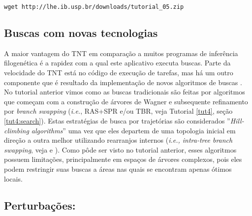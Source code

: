 \begin{center}
\small \texttt{wget http://lhe.ib.usp.br/downloads/tutorial\_05.zip}\\
\end{center}


\newpage
\pagestyle{fancy} %
\begin{refsection}
\renewcommand*{\finalnamedelim}{\addspace\&\space}%

\section{Buscas com novas tecnologias}\label{tut5:newtech}

A maior vantagem do TNT \parencite{GoloboffEtAl_2008} em comparação a muitos programas de inferência filogenética é a rapidez com a qual este aplicativo executa buscas. Parte da velocidade do TNT está no código de execução de tarefas, mas há um outro componente que é resultado da implementação de novos algoritmos de buscas \parencite{Goloboff_1999, Nixon_1999}. No tutorial anterior vimos como as buscas tradicionais são feitas por algoritmos que começam com a construção de árvores de Wagner e subsequente refinamento por \textit{branch swapping} (\textit{i.e.}, RAS+SPR e/ou TBR, veja Tutorial \ref{tut4}, seção \ref{tut4:search}). Estas estratégias de busca por trajetórias são considerados ''\textit{Hill-climbing algorithms}'' uma vez que eles departem de uma topologia inicial em direção a outra melhor utilizando rearranjos internos (\textit{i.e., intra-tree branch swapping}, veja \textcite{Giribet_2007} e \textcite{Goloboff_1999}). Como pôde ser visto no tutorial anterior, esses algoritmos possuem limitações, principalmente em espaços de árvores complexos, pois eles podem restringir suas buscas a áreas nas quais se encontram apenas ótimos locais.

\subsection{Perturbações:}


\end{refsection}
